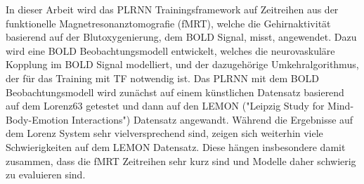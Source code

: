 \documentclass[a4paper, 11pt, oneside]{Thesis}  %
\begin{document}
  In dieser Arbeit wird das PLRNN Trainingsframework auf Zeitreihen aus der funktionelle Magnetresonanztomografie (fMRT), welche die Gehirnaktivität 
  basierend auf der Blutoxygenierung, dem BOLD Signal, misst, angewendet. Dazu wird eine BOLD Beobachtungsmodell entwickelt, welches die neurovaskuläre
  Kopplung im BOLD Signal modelliert, und der dazugehörige Umkehralgorithmus, der für das Training mit TF notwendig ist. Das PLRNN mit dem BOLD
  Beobachtungsmodell wird zunächst auf einem künstlichen Datensatz basierend auf dem Lorenz63 getestet und dann auf den LEMON
  ("Leipzig Study for Mind-Body-Emotion Interactions") Datensatz angewandt. Während die Ergebnisse auf dem Lorenz System sehr vielversprechend sind,
  zeigen sich weiterhin viele Schwierigkeiten auf dem LEMON Datensatz. Diese hängen insbesondere damit zusammen, dass die fMRT Zeitreihen 
  sehr kurz sind und Modelle daher schwierig zu evaluieren sind.
\vfil\vfil\vfil\null
\cleardoublepage

\tableofcontents  %

\listoffigures  %

\listoftables  %


\end{document}
